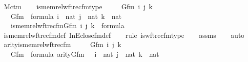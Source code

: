 \begin{isabellebody}
\isanewline
{}\isamarkupfalse%
\ M{\isacharunderscore}{\kern0pt}ctm\ \isanewline
{}\ \isanewline
\isanewline
{}\isamarkupfalse%
\ is{\isacharunderscore}{\kern0pt}memrel{\isacharunderscore}{\kern0pt}wftrec{\isacharunderscore}{\kern0pt}fm{\isacharunderscore}{\kern0pt}type\ {\isacharcolon}{\kern0pt}\ \isanewline
\ \ \ Gfm\ i\ j\ k\ \isanewline
\ \ \ {\isachardoublequoteopen}Gfm\ {\isasymin}\ formula{\isachardoublequoteclose}\ {\isachardoublequoteopen}i\ {\isasymin}\ nat{\isachardoublequoteclose}\ {\isachardoublequoteopen}j\ {\isasymin}\ nat{\isachardoublequoteclose}\ {\isachardoublequoteopen}k\ {\isasymin}\ nat{\isachardoublequoteclose}\ \isanewline
\ \ \ {\isachardoublequoteopen}is{\isacharunderscore}{\kern0pt}memrel{\isacharunderscore}{\kern0pt}wftrec{\isacharunderscore}{\kern0pt}fm{\isacharparenleft}{\kern0pt}Gfm{\isacharcomma}{\kern0pt}\ i{\isacharcomma}{\kern0pt}\ j{\isacharcomma}{\kern0pt}\ k{\isacharparenright}{\kern0pt}\ {\isasymin}\ formula{\isachardoublequoteclose}\ \isanewline
%
\isadelimproof
\ \isanewline
\ \ %
\endisadelimproof
%
\isatagproof
{}\isamarkupfalse%
\ is{\isacharunderscore}{\kern0pt}memrel{\isacharunderscore}{\kern0pt}wftrec{\isacharunderscore}{\kern0pt}fm{\isacharunderscore}{\kern0pt}def\ InEclose{\isacharunderscore}{\kern0pt}fm{\isacharunderscore}{\kern0pt}def\ \isanewline
\ \ \isamarkupfalse%
{\isacharparenleft}{\kern0pt}rule\ is{\isacharunderscore}{\kern0pt}wftrec{\isacharunderscore}{\kern0pt}fm{\isacharunderscore}{\kern0pt}type{\isacharparenright}{\kern0pt}\isanewline
\ \ \isamarkupfalse%
\ assms\isanewline
\ \ \isamarkupfalse%
\ auto%
\endisatagproof
{\isafoldproof}%
%
\isadelimproof
\isanewline
%
\endisadelimproof
\isanewline
{}\isamarkupfalse%
\ arity{\isacharunderscore}{\kern0pt}is{\isacharunderscore}{\kern0pt}memrel{\isacharunderscore}{\kern0pt}wftrec{\isacharunderscore}{\kern0pt}fm\ {\isacharcolon}{\kern0pt}\ \isanewline
\ \ \ Gfm\ i\ j\ k\ \isanewline
\ \ \ {\isachardoublequoteopen}Gfm\ {\isasymin}\ formula{\isachardoublequoteclose}\ {\isachardoublequoteopen}arity{\isacharparenleft}{\kern0pt}Gfm{\isacharparenright}{\kern0pt}\ {\isasymle}\ {}{\isachardoublequoteclose}\ {\isachardoublequoteopen}i\ {\isasymin}\ nat{\isachardoublequoteclose}\ {\isachardoublequoteopen}j\ {\isasymin}\ nat{\isachardoublequoteclose}\ {\isachardoublequoteopen}k\ {\isasymin}\ nat{\isachardoublequoteclose}\ \isanewline

\end{isabellebody}
